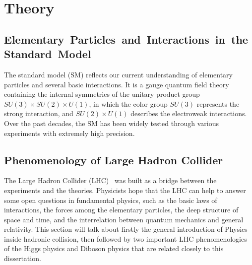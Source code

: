 
\chapter{Theory}

\section{Elementary Particles and Interactions in the Standard Model}
The standard model (SM) reflects our current understanding of elementary particles and several basic interactions.
It is a gauge quantum field theory containing the internal symmetries of the unitary product group $SU(3) \times SU(2) \times U(1)$, 
in which the color group $SU(3)$ represents the strong interaction, and $SU(2) \times U(1)$ describes the electroweak interactions.
Over the past decades, the SM has been widely tested through various experiments with extremely high precision.






\section{Phenomenology of Large Hadron Collider}
The Large Hadron Collider (LHC)~\cite{Bruning:2004ej, Buning:2004wk, Benedikt:2004wm} was built as a bridge between the experiments and the theories.
Physicists hope that the LHC can help to answer some open questions in fundamental physics, 
such as the basic laws of interactions, the forces among the elementary particles, 
the deep structure of space and time, and the interrelation between quantum mechanics and general relativity.
This section will talk about firstly the general introduction of Physics inside hadronic collision,
then followed by two important LHC phenomenologies of the Higgs physics and Diboson physics that are related closely to this dissertation.

